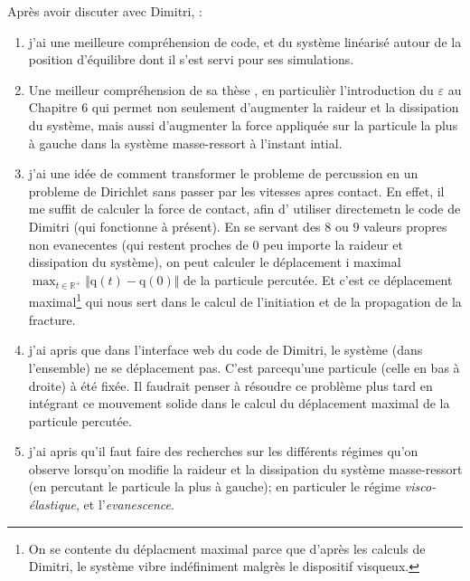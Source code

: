\documentclass[
  french,
	11pt, %
]{fphw}
\newcommand{\bvec}[1]{\bm{\mathrm{#1}}}  %
\begin{document}
Après avoir discuter avec Dimitri, :
\begin{enumerate}
  \item j'ai une meilleure compréhension de code, et du système linéarisé autour de la position d'équilibre dont il s'est servi pour ses simulations.
  \item Une meilleur compréhension de sa thèse \parencite{balasoiu2020halthesis}, en particulièr l'introduction du $\varepsilon$ au Chapitre 6 qui permet non seulement d'augmenter la raideur et la dissipation du système, mais aussi d'augmenter la force appliquée sur la particule la plus à gauche dans la système masse-ressort à l'instant intial.
  \item j'ai une idée de comment transformer le probleme de percussion en un probleme de Dirichlet sans passer par les vitesses apres contact. En effet, il me suffit de calculer la force de contact, afin d' utiliser directemetn le code de Dimitri (qui fonctionne à présent). En se servant des $8$ ou $9$ valeurs propres non evanecentes (qui restent proches de $0$ peu importe la raideur et dissipation du système), on peut calculer le déplacement $\bm{\mathrm{i}}$ maximal $\max_{t\in\mathbb{R}^{+}}{\Vert \bvec{q}(t) - \bvec{q}(0)\Vert}$ de la particule percutée. Et c'est ce déplacement maximal\footnote{On se contente du déplacment maximal parce que d'après les calculs de Dimitri, le système vibre indéfiniment malgrès le dispositif visqueux.} qui nous sert dans le calcul de l'initiation et de la propagation de la fracture.
  \item j'ai apris que dans l'interface web du code de Dimitri, le système (dans l'ensemble) ne se déplacement pas. C'est parcequ'une particule (celle en bas à droite) à été fixée. Il faudrait penser à résoudre ce problème plus tard en intégrant ce mouvement solide dans le calcul du déplacement maximal de la particule percutée. 
  \item j'ai apris qu'il faut faire des recherches sur les différents régimes qu'on observe lorsqu'on modifie la raideur et la dissipation du système masse-ressort (en percutant le particule la plus à gauche); en particuler le régime \emph{visco-élastique}, et l'\emph{evanescence}. 
\end{enumerate}

 
\clearpage   %
\printbibliography
\end{document}
